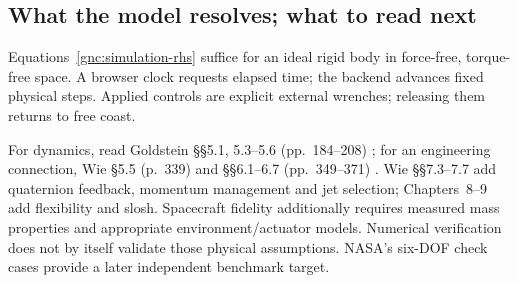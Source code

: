 \subsection{What the model resolves; what to read next}
Equations~\eqref{gnc:simulation-rhs} suffice for an ideal rigid body in
force-free, torque-free space. A browser clock requests elapsed time;
the backend advances fixed physical steps. Applied controls are explicit
external wrenches; releasing them returns to free coast.

For dynamics, read Goldstein \S\S5.1, 5.3--5.6 (pp.~184--208)
\cite{dgdt:GPS2001}; for an engineering connection, Wie
\S5.5 (p.~339) and \S\S6.1--6.7 (pp.~349--371)
\cite{BWie2008}. Wie \S\S7.3--7.7 add quaternion feedback, momentum
management and jet selection; Chapters~8--9 add flexibility and slosh.
Spacecraft fidelity additionally requires measured mass properties and
appropriate environment/actuator models. Numerical verification does not
by itself validate those physical assumptions. NASA's six-DOF check cases
\cite{NASA6DOF2015} provide a later independent benchmark target.
